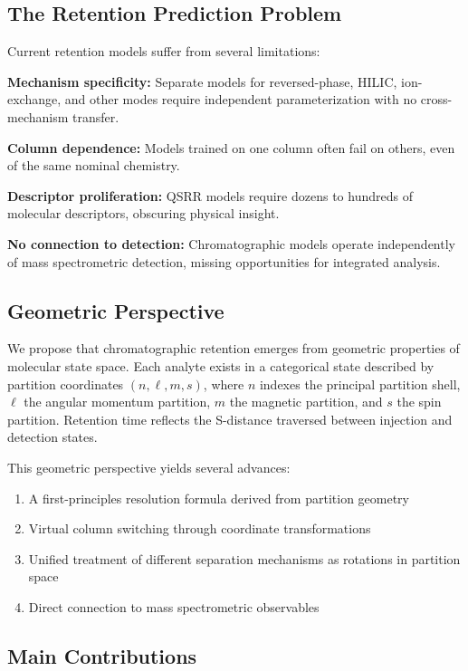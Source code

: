 \documentclass[twocolumn,10pt]{article}
\begin{document}
\subsection{The Retention Prediction Problem}

Current retention models suffer from several limitations:

\textbf{Mechanism specificity:} Separate models for reversed-phase, HILIC, ion-exchange, and other modes require independent parameterization with no cross-mechanism transfer.

\textbf{Column dependence:} Models trained on one column often fail on others, even of the same nominal chemistry.

\textbf{Descriptor proliferation:} QSRR models require dozens to hundreds of molecular descriptors, obscuring physical insight.

\textbf{No connection to detection:} Chromatographic models operate independently of mass spectrometric detection, missing opportunities for integrated analysis.

\subsection{Geometric Perspective}

We propose that chromatographic retention emerges from geometric properties of molecular state space. Each analyte exists in a categorical state described by partition coordinates $(n, \ell, m, s)$, where $n$ indexes the principal partition shell, $\ell$ the angular momentum partition, $m$ the magnetic partition, and $s$ the spin partition. Retention time reflects the S-distance traversed between injection and detection states.

This geometric perspective yields several advances:
\begin{enumerate}
    \item A first-principles resolution formula derived from partition geometry
    \item Virtual column switching through coordinate transformations
    \item Unified treatment of different separation mechanisms as rotations in partition space
    \item Direct connection to mass spectrometric observables
\end{enumerate}

\subsection{Main Contributions}
\end{document}
